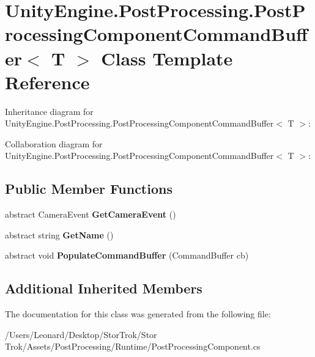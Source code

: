 \hypertarget{class_unity_engine_1_1_post_processing_1_1_post_processing_component_command_buffer}{}\section{Unity\+Engine.\+Post\+Processing.\+Post\+Processing\+Component\+Command\+Buffer$<$ T $>$ Class Template Reference}
\label{class_unity_engine_1_1_post_processing_1_1_post_processing_component_command_buffer}


Inheritance diagram for Unity\+Engine.\+Post\+Processing.\+Post\+Processing\+Component\+Command\+Buffer$<$ T $>$\+:


Collaboration diagram for Unity\+Engine.\+Post\+Processing.\+Post\+Processing\+Component\+Command\+Buffer$<$ T $>$\+:
\subsection*{Public Member Functions}
\begin{DoxyCompactItemize}
\item 
\mbox{\label{class_unity_engine_1_1_post_processing_1_1_post_processing_component_command_buffer_a762bd618a8e857e1b484ab8748fc6ab5}} 
abstract Camera\+Event {\bfseries Get\+Camera\+Event} ()
\item 
\mbox{\label{class_unity_engine_1_1_post_processing_1_1_post_processing_component_command_buffer_a7ea25da2189feccdbe69a0e2cafbda12}} 
abstract string {\bfseries Get\+Name} ()
\item 
\mbox{\label{class_unity_engine_1_1_post_processing_1_1_post_processing_component_command_buffer_a2ebd8748a9a219b4bf95d9a0e2056f3c}} 
abstract void {\bfseries Populate\+Command\+Buffer} (Command\+Buffer cb)
\end{DoxyCompactItemize}
\subsection*{Additional Inherited Members}


The documentation for this class was generated from the following file\+:\begin{DoxyCompactItemize}
\item 
/\+Users/\+Leonard/\+Desktop/\+Stor\+Trok/\+Stor Trok/\+Assets/\+Post\+Processing/\+Runtime/Post\+Processing\+Component.\+cs\end{DoxyCompactItemize}
